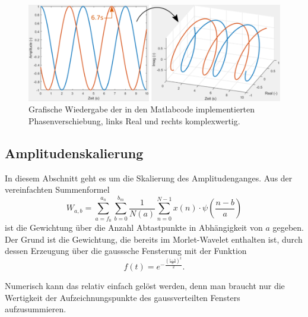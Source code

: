 \begin{figure}
	\centering
	\includegraphics[width=\textwidth]{papers/wavelets/images/10-3_PhaseShiftBsp.png}
	\caption{Grafische Wiedergabe der in den Matlabcode implementierten Phasenverschiebung, links Real und rechts komplexwertig.}
	\label{wavelet:fig:PhaseShiftBsp}
\end{figure}

\subsection{Amplitudenskalierung
	\label{wavelets:subsection:Amplitudenskalierung}}
In diesem Abschnitt geht es um die Skalierung des Amplitudenganges.
Aus der vereinfachten Summenformel \[W_{a,b}=\sum_{a=f_0}^{a_n}\sum_{b=0}^{b_m}\frac{1}{N(a)}\sum_{n=0}^{N-1} x(n)\cdot\psi\left(\frac{n-b}{a}\right)\] ist die Gewichtung über die Anzahl Abtastpunkte in Abhängigkeit von $a$ gegeben. Der Grund ist die Gewichtung, die bereits im Morlet-Wavelet enthalten ist, durch dessen Erzeugung über die gausssche Fensterung mit der Funktion \[f(t)=e^{-\frac{\left(\frac{t-b}{a}\right)^2}{2}}.\]

Numerisch kann das relativ einfach gelöst werden, denn man braucht nur die Wertigkeit der Aufzeichnungspunkte des gaussverteilten Fensters aufzusummieren.

